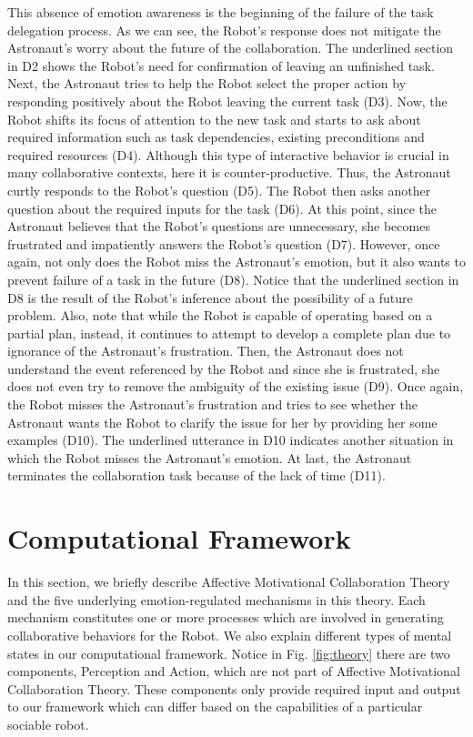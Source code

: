 This absence of emotion awareness is the beginning of the failure of the task
delegation process. As we can see, the Robot's response does not mitigate the
Astronaut's worry about the future of the collaboration. The underlined
section in D2 shows the Robot's need for confirmation of leaving an unfinished
task. Next, the Astronaut tries to help the Robot select the proper action by
responding positively about the Robot leaving the current task (D3). Now, the
Robot shifts its focus of attention to the new task and starts to ask about
required information such as task dependencies, existing preconditions and
required resources (D4). Although this type of interactive behavior is crucial
in many collaborative contexts, here it is counter-productive. Thus, the
Astronaut curtly responds to the Robot's question (D5). The Robot then asks
another question about the required inputs for the task (D6). At this point,
since the Astronaut believes that the Robot's questions are unnecessary, she
becomes frustrated and impatiently answers the Robot's question (D7). However,
once again, not only does the Robot miss the Astronaut's emotion, but it also
wants to prevent failure of a task in the future (D8). Notice that the
underlined section in D8 is the result of the Robot's inference about the
possibility of a future problem. Also, note that while the Robot is capable of
operating based on a partial plan, instead, it continues to attempt to develop a
complete plan due to ignorance of the Astronaut's frustration. Then, the
Astronaut does not understand the event referenced by the Robot and since she is
frustrated, she does not even try to remove the ambiguity of the existing issue
(D9). Once again, the Robot misses the Astronaut's frustration and tries to see
whether the Astronaut wants the Robot to clarify the issue for her by providing
her some examples (D10). The underlined utterance in D10 indicates another
situation in which the Robot misses the Astronaut's emotion. At last, the
Astronaut terminates the collaboration task because of the lack of time (D11).

\section{Computational Framework}
\label{sec:computational-framework}

In this section, we briefly describe Affective Motivational Collaboration
Theory and the five underlying emotion-regulated mechanisms in this theory. Each
mechanism constitutes one or more processes which are involved in generating
collaborative behaviors for the Robot. We also explain different types of mental
states in our computational framework. Notice in Fig. \ref{fig:theory} there are
two components, Perception and Action, which are not part of Affective
Motivational Collaboration Theory. These components only provide required input
and output to our framework which can differ based on the capabilities of a
particular sociable robot.

